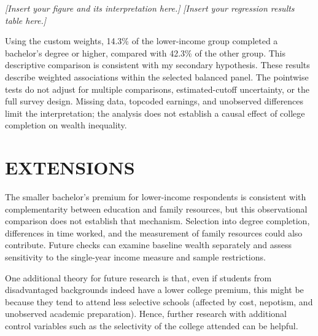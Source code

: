 \documentclass[12pt,letterpaper]{article}
\begin{document}
\textit{[Insert your figure and its interpretation here.]}
\textit{[Insert your regression results table here.]}

Using the custom weights, 14.3\% of the lower-income group completed a bachelor's
degree or higher, compared with 42.3\% of the other group. This descriptive comparison
is consistent with my secondary hypothesis. These results describe weighted
associations within the selected balanced panel. The pointwise tests do not adjust
for multiple comparisons, estimated-cutoff uncertainty, or the full survey design.
Missing data, topcoded earnings, and unobserved differences
limit the interpretation; the analysis does not establish a causal effect of college
completion on wealth inequality.

\section*{EXTENSIONS}
The smaller bachelor's premium for lower-income respondents is consistent with
complementarity between education and family resources, but this observational
comparison does not establish that mechanism. Selection into degree completion,
differences in time worked, and the measurement of family resources could also
contribute. Future checks can examine baseline wealth separately and assess
sensitivity to the single-year income measure and sample restrictions.

One additional theory for future research is that, even if students from disadvantaged
backgrounds indeed have a lower college premium, this might be because they tend to
attend less selective schools (affected by cost, nepotism, and unobserved academic
preparation). Hence, further research with additional control variables such as the
selectivity of the college attended can be helpful.
\end{document}
